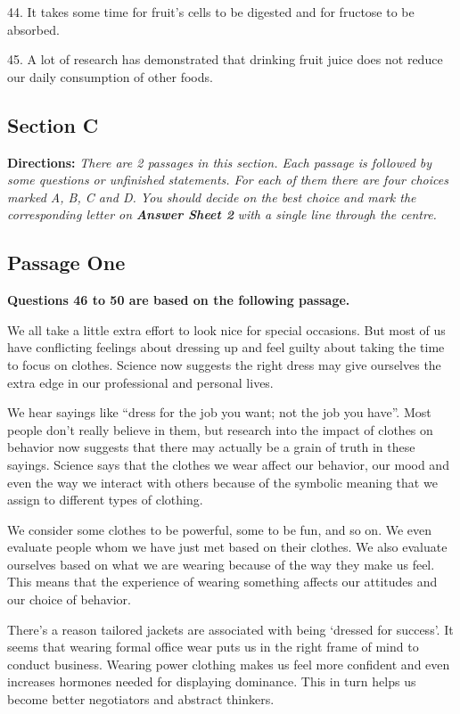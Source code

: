 \documentclass[UTF8,11pt]{ctexart}
\begin{document}
44. It takes some time for fruit’s cells to be digested and for fructose to be absorbed.


45. A lot of research has demonstrated that drinking fruit juice does not reduce our daily consumption of other foods.


\subsection*{\textbf{Section C}}


\textbf{Directions: }\textit{There are 2 passages in this section. Each passage is followed by some questions or unfinished} \textit{statements. For each of them there are four choices marked A, B, C and D. You should decide on the best choice} \textit{and mark the corresponding letter on }\textbf{\textit{Answer Sheet 2}}\textit{ with a single line through the centre.}


\subsection*{\textbf{Passage One}}


\textbf{Questions 46 to 50 are based on the following passage.}


We all take a little extra effort to look nice for special occasions. But most of us have conflicting feelings about dressing up and feel guilty about taking the time to focus on clothes. Science now suggests the right dress may give ourselves the extra edge in our professional and personal lives.


We hear sayings like “dress for the job you want; not the job you have”. Most people don’t really believe in them, but research into the impact of clothes on behavior now suggests that there may actually be a grain of truth in these sayings. Science says that the clothes we wear affect our behavior, our mood and even the way we interact with others because of the symbolic meaning that we assign to different types of clothing.


We consider some clothes to be powerful, some to be fun, and so on. We even evaluate people whom we have just met based on their clothes. We also evaluate ourselves based on what we are wearing because of the way they make us feel. This means that the experience of wearing something affects our attitudes and our choice of behavior.


There’s a reason tailored jackets are associated with being ‘dressed for success’. It seems that wearing formal office wear puts us in the right frame of mind to conduct business. Wearing power clothing makes us feel more confident and even increases hormones needed for displaying dominance. This in turn helps us become better negotiators and abstract thinkers.
\end{document}
